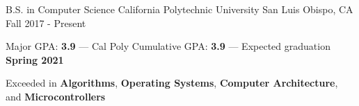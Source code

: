 

\begin{cventries}

  \cventry
    {B.S. in Computer Science} %
    {California Polytechnic University} %
    {San Luis Obispo, CA} %
    {Fall 2017 - Present} %
    {
      \begin{cvitems} %
        \item {Major GPA: \textbf{3.9} --- Cal Poly Cumulative GPA: \textbf{3.9}} --- Expected graduation \textbf{Spring 2021}
        \item {Exceeded in \textbf{Algorithms}, \textbf{Operating Systems}, \textbf{Computer Architecture}, and \textbf{Microcontrollers}}
      \end{cvitems}
    }

\end{cventries}
